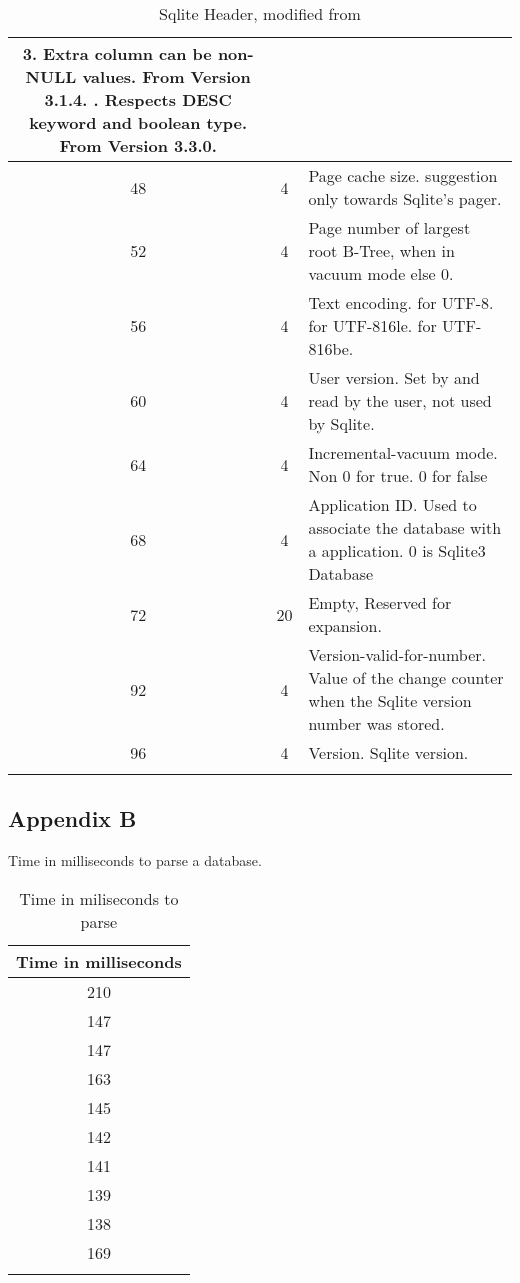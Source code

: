 \begin{longtable}[h]{| c | c | p{10cm} |}
			3. Extra column can be non-NULL values. From Version 3.1.4. \newline
			4. Respects DESC keyword and boolean type. From Version 3.3.0. \newline \\
		\hline
			48 & 4 & Page cache size. suggestion only towards Sqlite's pager. \\
		\hline
			52 & 4 & Page number of largest root B-Tree, when in vacuum mode else 0. \\
		\hline
			56 & 4 & Text encoding. \newline
			 1 for UTF-8. \newline 
			 2 for UTF-816le. \newline 
			 3 for UTF-816be. \\
		\hline
			60 & 4 & User version. Set by and read by the user, not used by Sqlite. \\
		\hline
			64 & 4 & Incremental-vacuum mode. Non 0 for true. 0 for false \\
		\hline
			68 & 4 & Application ID. Used to associate the database with a application. 0 is Sqlite3 Database \\
		\hline
			72 & 20 & Empty, Reserved for expansion. \\
		\hline
			92 & 4 & Version-valid-for-number. Value of the change counter when the Sqlite version number was stored. \\
		\hline
			96 & 4 & Version. Sqlite version. \\
		\hline
	\caption{Sqlite Header, modified from \cite{sqlite}}
	\label{tbl:sqlite_header}
\end{longtable}

\subsection{Appendix B}
\label{subsec:append_b}

Time in milliseconds to parse a database.

\begin{longtable}[h]{| c |}
		\hline
			\textbf{Time in milliseconds} \\ 
		\hline
		\endhead
 		210 \\
 				\hline
		147 \\
				\hline
		147 \\
				\hline
		163 \\
				\hline
		145 \\
				\hline
		142 \\
				\hline
		141 \\
				\hline
		139 \\
				\hline
		138 \\
				\hline
		169 \\
				\hline
	\caption{Time in miliseconds to parse}
	\label{tbl:time_patse}
\end{longtable}